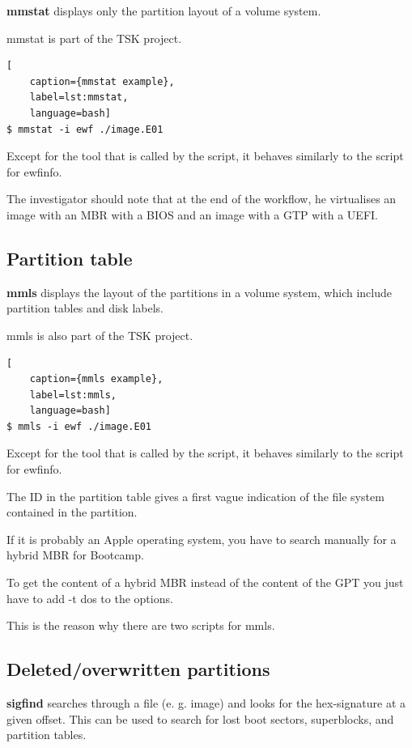 \textbf{mmstat} displays only the partition layout of a volume system.

mmstat is part of the TSK project.

\begin{lstlisting}[
    caption={mmstat example},
    label=lst:mmstat,
    language=bash]
$ mmstat -i ewf ./image.E01
\end{lstlisting}

Except for the tool that is called by the script, it behaves similarly to the script for ewfinfo.

The investigator should note that at the end of the workflow, he virtualises an image with an MBR with a BIOS and an image with a GTP with a UEFI.

\subsection{Partition table}

\textbf{mmls} displays the layout of the partitions in a volume system, which include partition tables and disk labels.

mmls is also part of the TSK project.

\begin{lstlisting}[
    caption={mmls example},
    label=lst:mmls,
    language=bash]
$ mmls -i ewf ./image.E01
\end{lstlisting}

Except for the tool that is called by the script, it behaves similarly to the script for ewfinfo.

The ID in the partition table gives a first vague indication of the file system contained in the partition.

If it is probably an Apple operating system, you have to search manually for a hybrid MBR for Bootcamp.

To get the content of a hybrid MBR instead of the content of the GPT you just have to add \glqq{}-t dos\grqq{} to the options.

This is the reason why there are two scripts for mmls.

\subsection{Deleted/overwritten partitions}

\textbf{sigfind} searches through a file (e. g. image) and looks for the hex-signature at a given offset. This can be used to search for lost boot sectors, superblocks, and partition tables.

